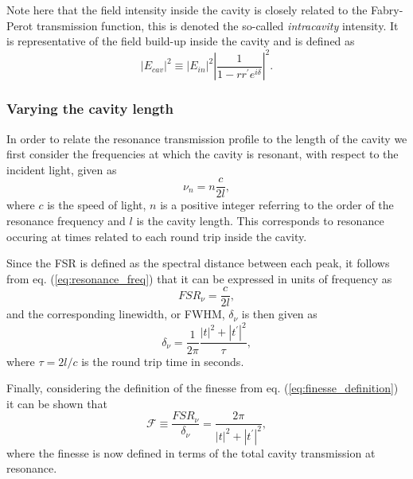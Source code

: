 Note here that the field intensity inside the cavity is closely related to the Fabry-Perot transmission function, this is denoted the so-called \emph{intracavity} intensity. It is representative of the field build-up inside the cavity and is defined as 
\begin{equation}
    |E_{cav}|^2 \equiv |E_{in}|^2 \left|\frac{1}{1-rr^{\prime}e^{i\delta}}\right|^2.
    \label{eq:intracavity_intensity}
\end{equation}

\subsubsection{Varying the cavity length}

In order to relate the resonance transmission profile to the length of the cavity we first consider the frequencies at which the cavity is resonant, with respect to the incident light, given as
\begin{equation}
    \nu_n = n \frac{c}{2l},
    \label{eq:resonance_freq}
\end{equation}
where $c$ is the speed of light, $n$ is a positive integer referring to the order of the resonance frequency and $l$ is the cavity length. This corresponds to resonance occuring at times related to each round trip inside the cavity. 

Since the FSR is defined as the spectral distance between each peak, it follows from eq. (\ref{eq:resonance_freq}) that it can be expressed in units of frequency as 
\begin{equation}
    FSR_{\nu} = \frac{c}{2l},
    \label{eq:FSR_vs_cavity_length}
\end{equation}
and the corresponding linewidth, or FWHM, $\delta_{\nu}$ is then given as
\begin{equation}
    \delta_{\nu} = \frac{1}{2 \pi} \frac{|t|^2 + |t^{\prime}|^2}{\tau},
\end{equation}
where $\tau = 2l/c$ is the round trip time in seconds. 

Finally, considering the definition of the finesse from eq. (\ref{eq:finesse_definition}) it can be shown that
\begin{equation}
    \mathcal{F} \equiv \frac{FSR_{\nu}}{\delta_{\nu}} = \frac{2 \pi}{|t|^2 + |t^{\prime}|^2},
    \label{eq:lossless_finesse}
\end{equation}
where the finesse is now defined in terms of the total cavity transmission at resonance. 

